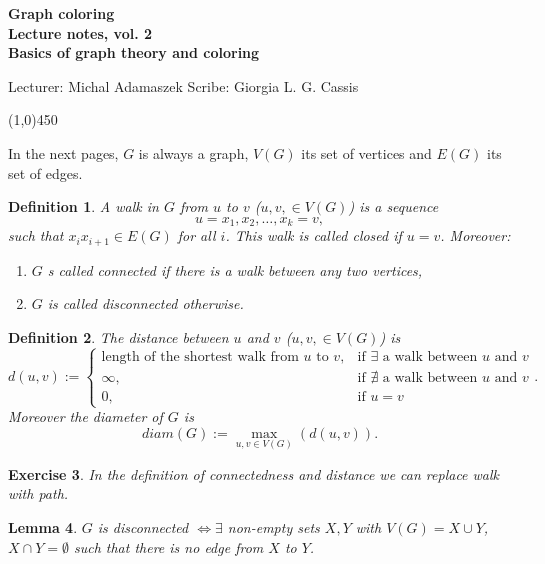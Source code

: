 \documentclass[a4paper]{article}
\theoremstyle{plain}
\newtheorem{lemma}{Lemma}
\newtheorem{definition}[lemma]{Definition}
\theoremstyle{myremark}
\newtheorem{exercise}[lemma]{Exercise}
\begin{document}
\thispagestyle{empty}

\begin{center}
	{\Large\bf Graph coloring}\\
	{\bf Lecture notes, vol. 2 \\ Basics of graph theory and coloring}\\
\end{center}
Lecturer: Michal Adamaszek \hfill Scribe: Giorgia L. G. Cassis
\begin{center}
\line(1,0){450}
\end{center}


In the next pages, $G$ is always a graph, $V(G)$ its set of vertices and $E(G)$ its set of edges. 
\begin{definition}
A \emph{walk} in $G$ from $u$ to $v$ ($u,v, \in V(G)$) is a sequence
$$u=x_1,x_2,\dots,x_k=v,$$
such that $x_ix_{i+1} \in E(G)$ for all $i$. This walk is called closed if $u=v$. Moreover:
\begin{enumerate}
\item $G$ s called \emph{connected} if there is a walk between any two vertices,
\item $G$ is called \emph{disconnected} otherwise.
\end{enumerate}
\end{definition}

\begin{definition} The \emph{distance} between $u$ and $v$ ($u,v, \in V(G)$) is
$$d(u,v):=
\begin{cases} 
\text{length of the shortest walk from $u$ to $v$}, & \text{if $\exists$ a walk between $u$ and $v$}\\ 
\infty, & \text{if $\nexists$ a walk between $u$ and $v$}\\
0, & \text{if } u=v
\end{cases}.$$
Moreover the \emph{diameter} of $G$ is
$$diam(G):= \max_{u,v\in V(G)}(d(u,v)).$$
\end{definition}

\begin{exercise} In the definition of connectedness and distance we can replace \emph{walk} with \emph{path}.
\end{exercise}

\begin{lemma} $G$ is disconnected $\Longleftrightarrow \exists$ non-empty sets $X,Y$ with $V(G)=X \cup Y$, $X \cap Y=\emptyset$ such that there is no edge from $X$ to $Y$.
\end{lemma}
\end{document}
